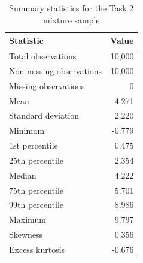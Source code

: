 \begin{table}[htbp]
\centering
\caption{Summary statistics for the Task 2 mixture sample}
\label{tab:task2-summary}
\begin{tabular}{lr}
\toprule
Statistic & Value \\
\midrule
Total observations & 10,000 \\
Non-missing observations & 10,000 \\
Missing observations & 0 \\
Mean & 4.271 \\
Standard deviation & 2.220 \\
Minimum & -0.779 \\
1st percentile & 0.475 \\
25th percentile & 2.354 \\
Median & 4.222 \\
75th percentile & 5.701 \\
99th percentile & 8.986 \\
Maximum & 9.797 \\
Skewness & 0.356 \\
Excess kurtosis & -0.676 \\
\bottomrule
\end{tabular}
\end{table}
